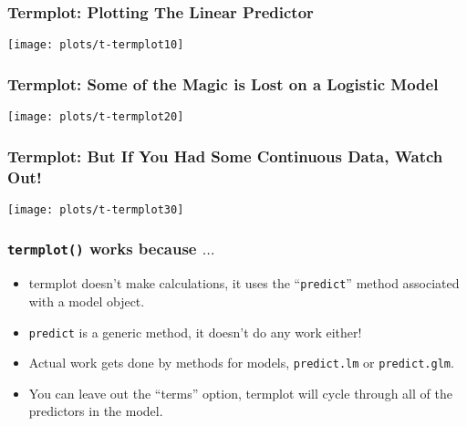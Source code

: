 \documentclass[10pt,english]{beamer}
\begin{document}




%   




\begin{frame}[containsverbatim]
  \frametitle{Termplot: Plotting The Linear Predictor}



\texttt{[image: plots/t-termplot10]}
\end{frame}


\begin{frame}[containsverbatim]
  \frametitle{Termplot: Some of the Magic is Lost on a Logistic Model}



\texttt{[image: plots/t-termplot20]}
\end{frame}



\begin{frame}[containsverbatim]
  \frametitle{Termplot: But If You Had Some Continuous Data, Watch Out!}


\texttt{[image: plots/t-termplot30]}
\end{frame}




\begin{frame}[containsverbatim]
  \frametitle{\texttt{termplot()} works because $\ldots$}

  \begin{itemize}
  \item termplot doesn't make calculations, it uses the
    ``\texttt{predict}'' method associated with a model object.
  \item \texttt{predict} is a generic method, it doesn't do any work either!
  \item Actual work gets done by methods for models,
    \texttt{predict.lm} or  \texttt{predict.glm}.
  \item You can leave out the ``terms'' option, termplot will
    cycle through all of the predictors in the model.
  \end{itemize}
\end{frame}
\end{document}
